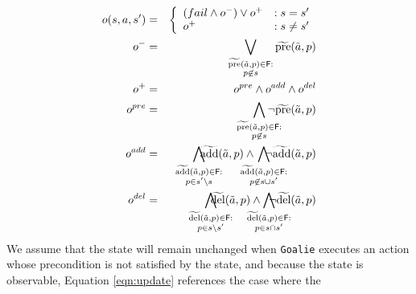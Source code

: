 \documentclass[letterpaper]{article}
\def\goalie{{\tt Goalie}}
\begin{document}
\noindent \begin{eqnarray}
o(s, a, s') &=& \left\{ \begin{array}{ll}
(fail \wedge o^-) \vee  o^+  &: s = s'\\
o^+  & : s \not= s'
\end{array}\right. \label{eqn:update}\\
o^- &=& \bigvee\limits_{\substack{\widetilde{\text{pre}}(\tilde{a},p) \in {\sf F}:\\ p \not\in s} } \widetilde{\text{pre}}(\tilde{a},p) \label{eqn:update1} \\
o^+ &=& o^{pre} \wedge o^{add} \wedge o^{del}\label{eqn:update2}\\
o^{pre} &=& \bigwedge\limits_{\substack{\widetilde{\text{pre}}(\tilde{a},p) \in {\sf F}:\\ p \not\in s} }\hspace*{-0.5cm}\neg \widetilde{\text{pre}}(\tilde{a},p)\label{eqn:update3}  \\
o^{add} &=&  \hspace*{-.5cm}\bigwedge\limits_{\substack{\widetilde{\text{add}}(\tilde{a},p) \in {\sf F}:\\ p\in s'\backslash s} }\hspace*{-0.75cm}\widetilde{\text{add}}(\tilde{a},p)   \wedge  \hspace*{-0.5cm}\bigwedge\limits_{\substack{\widetilde{\text{add}}(\tilde{a},p) \in {\sf F}: \\ p \not\in  s\cup s'}} \hspace*{-0.75cm}\neg \widetilde{\text{add}}(\tilde{a},p)   \label{eqn:update4}\\
o^{del} &=& \hspace*{-.5cm} \bigwedge\limits_{\substack{\widetilde{\text{del}}(\tilde{a},p) \in {\sf F}: \\p \in s \backslash s'}} \hspace*{-0.75cm}\widetilde{\text{del}}(\tilde{a},p)  \wedge  \hspace*{-0.5cm}\bigwedge\limits_{\substack{\widetilde{\text{del}}(\tilde{a},p) \in {\sf F}:\\ p \in s\cap s'}} \hspace*{-0.75cm}\neg \widetilde{\text{del}}(\tilde{a},p)  \label{eqn:update5}
\end{eqnarray}
\noindent We assume that the state will remain unchanged when \goalie{} executes
an action whose precondition is not satisfied by the state, and because the
state is observable, Equation \ref{eqn:update} references the case where the
\end{document}

